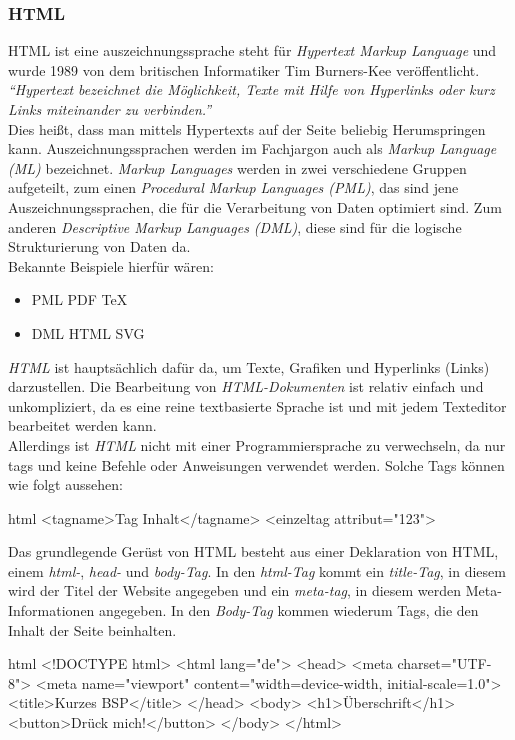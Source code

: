 		\subsubsection{HTML}
		HTML ist eine \Gls{auszeichnungssprache} steht für \textit{Hypertext Markup Language} und wurde 1989 von dem britischen Informatiker Tim Burners-Kee veröffentlicht.\\ 
		\textit{\enquote{Hypertext bezeichnet die Möglichkeit, Texte mit Hilfe von Hyperlinks oder kurz Links miteinander zu verbinden.}}\cite{html5-css3-def}\\ 
		Dies heißt, dass man mittels Hypertexts auf der Seite beliebig Herumspringen kann.
		Auszeichnungssprachen werden im Fachjargon auch als \textit{Markup Language (ML)} bezeichnet. \textit{Markup Languages} werden in zwei verschiedene Gruppen aufgeteilt, zum einen \textit{Procedural Markup Languages (PML)}, das sind jene Auszeichnungssprachen, die für die Verarbeitung von Daten optimiert sind. Zum anderen \textit{Descriptive Markup Languages (DML)}, diese sind für die logische Strukturierung von Daten da.\\Bekannte Beispiele hierfür wären:
		\begin{itemize}
		\item PML
		\subitem PDF
		\subitem TeX
		\item DML
		\subitem HTML
		\subitem SVG
		\end{itemize}
		\textit{HTML} ist hauptsächlich dafür da, um Texte, Grafiken und Hyperlinks (Links) darzustellen. Die Bearbeitung von \textit{HTML-Dokumenten} ist relativ einfach und unkompliziert, da es eine reine textbasierte Sprache ist und mit jedem Texteditor bearbeitet werden kann.\\
		Allerdings ist \textit{HTML} nicht mit einer Programmiersprache zu verwechseln, da nur \Gls{tag}s und keine Befehle oder Anweisungen verwendet werden. Solche Tags können wie folgt aussehen:
		\begin{code}{html}
			<tagname>Tag Inhalt</tagname>
			<einzeltag attribut="123">
		\end{code}
		Das grundlegende Gerüst von HTML besteht aus einer Deklaration von HTML, einem \textit{html-}, \textit{head-} und \textit{body-Tag}. In den \textit{html-Tag} kommt ein \textit{title-Tag}, in diesem wird der Titel der Website angegeben und ein \textit{meta-tag}, in diesem werden Meta-Informationen angegeben. In den \textit{Body-Tag} kommen wiederum Tags, die den Inhalt der Seite beinhalten. 
		\begin{code}{html}
			<!DOCTYPE html>
			<html lang="de">
				<head>
					<meta charset="UTF-8">
					<meta name="viewport" content="width=device-width, initial-scale=1.0">
					<title>Kurzes BSP</title>
				</head>
				<body>
					<h1>Überschrift</h1>
					<button>Drück mich!</button>
				</body>
			</html>
		\end{code}

